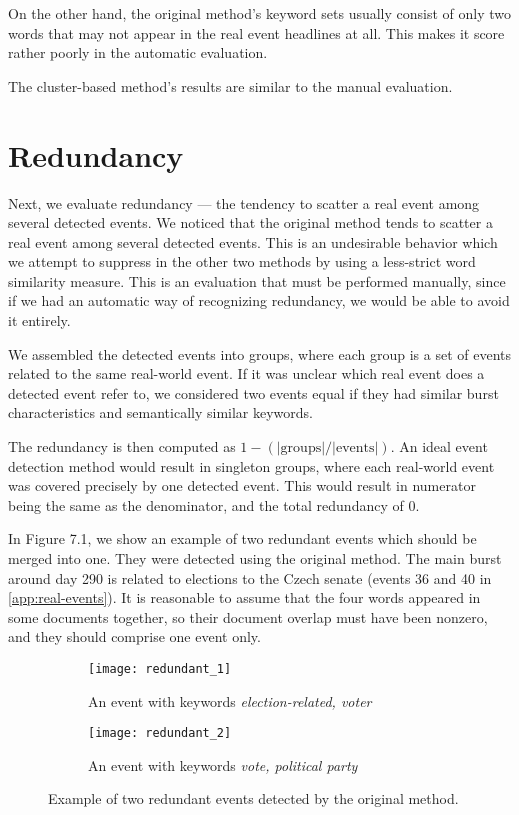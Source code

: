 On the other hand, the original method's keyword sets usually consist of only two words that may not appear in the real event headlines at all. This makes it score rather poorly in the automatic evaluation.

The cluster-based method's results are similar to the manual evaluation.

\section{Redundancy} \label{sec:redundancy}

Next, we evaluate redundancy --- the tendency to scatter a real event among several detected events. We noticed that the original method tends to scatter a real event among several detected events. This is an undesirable behavior which we attempt to suppress in the other two methods by using a less-strict word similarity measure. This is an evaluation that must be performed manually, since if we had an automatic way of recognizing redundancy, we would be able to avoid it entirely.

We assembled the detected events into groups, where each group is a set of events related to the same real-world event. If it was unclear which real event does a detected event refer to, we considered two events equal if they had similar burst characteristics and semantically similar keywords.

The redundancy is then computed as $1 - (\left| \text{groups} \right| / \left| \text{events} \right|)$. An ideal event detection method would result in singleton groups, where each real-world event was covered precisely by one detected event. This would result in numerator being the same as the denominator, and the total redundancy of 0.

In Figure 7.1, we show an example of two redundant events which should be merged into one. They were detected using the original method. The main burst around day 290 is related to elections to the Czech senate (events 36 and 40 in \autoref{app:real-events}). It is reasonable to assume that the four words appeared in some documents together, so their document overlap must have been nonzero, and they should comprise one event only.

\begin{figure}
\centering
\begin{subfigure}{.5\textwidth}
  \centering
  \texttt{[image: redundant\_1]}  %
  \caption{An event with keywords \textit{election-related, voter}}
  \label{fig:redundant-1}
\end{subfigure}%
\begin{subfigure}{.5\textwidth}
  \centering
  \texttt{[image: redundant\_2]}  %
  \caption{An event with keywords \textit{vote, political party}}
  \label{fig:redundant-2}
\end{subfigure}
\caption{Example of two redundant events detected by the original method.}
\end{figure} \label{fig:redundant-events}

